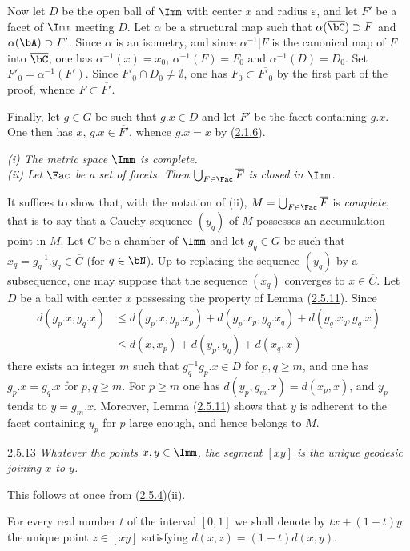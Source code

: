 \documentclass[12pt,a4paper,oneside,english]{smfart}
\makeatletter
\newcommand{\btanchor}[1]{\leavevmode\Hy@raisedlink{\hypertarget{bt:#1}{}}}
\newcommand{\btpageanchor}[1]{\Hy@raisedlink{\hypertarget{p:#1}{}}}
\newcommand{\btref}[1]{\hyperlink{bt:#1}{#1}}
\newcommand{\btpage}[1]{\marginnote{p.~#1}\btpageanchor{#1}}
\newcommand{\pagemark}[1]{\btpage{#1}}
\theoremstyle{definition}
\theoremstyle{bt}
\makeatother
\begin{document}
Now let $D$ be the open ball of $\Imm$ with center $x$ and radius
$\varepsilon$, and let $F'$ be a facet of $\Imm$ meeting $D$. Let $\alpha$ be
a structural map such that $\alpha(\overline{\bC})\supset F$ and
$\alpha(\bA)\supset F'$. Since $\alpha$ is an isometry, and since
$\alpha^{-1}|F$ is the canonical map of $F$ into $\overline{\bC}$, one has
$\alpha^{-1}(x)=x_0$, $\alpha^{-1}(F)=F_0$ and $\alpha^{-1}(D)=D_0$. Set
$F'_0=\alpha^{-1}(F')$. Since $F'_0\cap D_0\neq\emptyset$, one has
$F_0\subset\overline{F'_0}$ by the first part of the proof, whence
$F\subset\overline{F'}$.

Finally, let $g\in G$ be such that $g.x\in D$ and let $F'$ be the facet
containing $g.x$. One then has $x,\,g.x\in\overline{F'}$, whence $g.x=x$ by
(\btref{2.1.6}).

\btanchor{2.5.12}
\emph{(i) The metric space $\Imm$ is complete.\\
(ii) Let $\Fac$ be a set of facets. Then $\bigcup_{F\in\Fac}\overline{F}$ is
closed in $\Imm$.}

\medskip
It suffices to show that, with the notation of (ii),
$M=\bigcup_{F\in\Fac}\overline{F}$ is \emph{complete}, that is to say that a
Cauchy sequence $(y_q)$ of $M$ possesses an accumulation point in $M$. Let $C$
\pagemark{46}
be a chamber of $\Imm$ and let $g_q\in G$ be such that
$x_q=g_q^{-1}.y_q\in\overline{C}$ (for $q\in\bN$). Up to replacing the
sequence $(y_q)$ by a subsequence, one may suppose that the sequence $(x_q)$
converges to $x\in\overline{C}$. Let $D$ be a ball with center $x$ possessing
the property of Lemma (\btref{2.5.11}). Since
\begin{align*}
d(g_p.x,g_q.x)&\le d(g_p.x,g_p.x_p)+d(g_p.x_p,g_q.x_q)+d(g_q.x_q,g_q.x)\\
&\le d(x,x_p)+d(y_p,y_q)+d(x_q,x)
\end{align*}
there exists an integer $m$ such that $g_q^{-1}g_p.x\in D$ for $p,q\ge m$, and
one has $g_p.x=g_q.x$ for $p,q\ge m$. For $p\ge m$ one has
$d(y_p,g_m.x)=d(x_p,x)$, and $y_p$ tends to $y=g_m.x$. Moreover, Lemma
(\btref{2.5.11}) shows that $y$ is adherent to the facet containing $y_p$ for $p$
large enough, and hence belongs to $M$.

\num{2.5.13}\btanchor{2.5.13}
\emph{Whatever the points $x,y\in\Imm$, the segment $[xy]$ is the unique
geodesic joining $x$ to $y$.}

\medskip
This follows at once from (\btref{2.5.4})(ii).

For every real number $t$ of the interval $[0,1]$ we shall denote by
$tx+(1-t)y$ the unique point $z\in[xy]$ satisfying $d(x,z)=(1-t)d(x,y)$.
\end{document}
